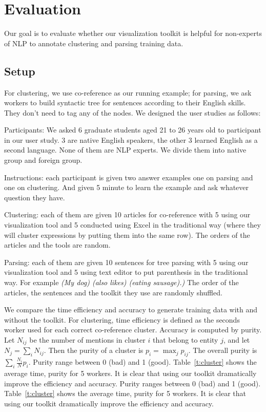 \section{Evaluation}
Our goal is to evaluate whether our visualization toolkit is helpful for non-experts of NLP to annotate clustering and parsing training data.

\subsection{Setup}
For clustering, we use co-reference as our running example; for parsing, we ask workers to build syntactic tree for sentences according to their English skills. They don't need to tag any of the nodes. We designed the user studies as follows:
\bi
\item Participants: We asked 6 graduate students aged 21 to 26 years old to participant in our user study. 3 are native English speakers, the other 3 learned English as a second language. None of them are NLP experts. We divide them into native group and foreign group.
\item Instructions: each participant is given two answer examples one on parsing and one on clustering. And given 5 minute to learn the example and ask whatever question they have.
\item Clustering: each of them are given 10 articles for co-reference with 5 using our visualization tool and 5 conducted using Excel in the traditional way (where they will cluster expressions by putting them into the same row). The orders of the articles and the tools are random.
\item Parsing: each of them are given 10 sentences for tree parsing with 5 using our visualization tool and 5 using text editor to put parenthesis in the traditional way. For example {\em (My dog) (also likes) (eating sausage).)}
\ei
The order of the articles, the sentences and the toolkit they use are randomly shuffled.

We compare the time efficiency and accuracy to generate training data with and without the toolkit. For clustering, time efficiency is defined as the seconds worker used for each correct co-reference cluster. Accuracy is computed by purity. Let $N_{ij}$ be the number of mentions in cluster $i$ that belong to entity $j$, and let $N_j=\sum_i N_{ij}$. Then the purity of a cluster is $p_i=\max_j p_{ij}$. The overall purity is $\sum_i \frac{N_i}{N} p_i$. Purity range between 0 (bad) and 1 (good). Table~\ref{t:cluster} shows the average time, purity for 5 workers. It is clear that using our toolkit dramatically improve the efficiency and accuracy. Purity ranges between 0 (bad) and 1 (good). Table~\ref{t:cluster} shows the average time, purity for 5 workers. It is clear that using our toolkit dramatically improve the efficiency and accuracy.

